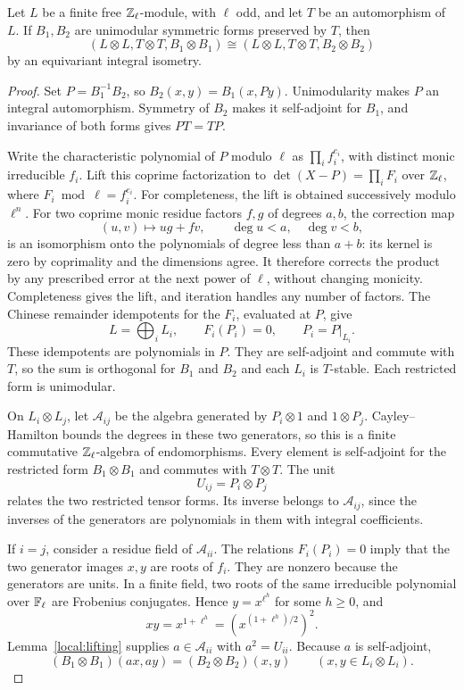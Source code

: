 \begin{proposition}\label{local:odd-primes}
Let $L$ be a finite free $\mathbb Z_\ell$-module, with $\ell$ odd, and let
$T$ be an automorphism of $L$.  If $B_1,B_2$ are unimodular symmetric
forms preserved by $T$, then
\[
 (L\otimes L,T\otimes T,B_1\otimes B_1)
 \cong
 (L\otimes L,T\otimes T,B_2\otimes B_2)
\]
by an equivariant integral isometry.
\end{proposition}

\begin{proof}
Set $P=B_1^{-1}B_2$, so
$B_2(x,y)=B_1(x,Py)$.  Unimodularity makes $P$ an integral
automorphism.  Symmetry of $B_2$ makes it self-adjoint for $B_1$, and
invariance of both forms gives $PT=TP$.

Write the characteristic polynomial of $P$ modulo $\ell$ as
$\prod_i f_i^{e_i}$, with distinct monic irreducible $f_i$.
Lift this coprime factorization to
$\det(X-P)=\prod_i F_i$ over $\mathbb Z_\ell$, where
$F_i\bmod\ell=f_i^{e_i}$.  For completeness, the lift is obtained
successively modulo $\ell^n$.  For two coprime monic residue factors
$f,g$ of degrees $a,b$, the correction map
\[
 (u,v)\longmapsto ug+fv,\qquad \deg u<a,\quad\deg v<b,
\]
is an isomorphism onto the polynomials of degree less than $a+b$:
its kernel is zero by coprimality and the dimensions agree.  It
therefore corrects the product by any prescribed error at the next
power of $\ell$, without changing monicity.  Completeness gives the
lift, and iteration handles any number of factors.  The Chinese remainder
idempotents for the $F_i$, evaluated at $P$, give
\[
 L=\bigoplus_i L_i,\qquad F_i(P_i)=0,
 \qquad P_i=P|_{L_i}.
\]
These idempotents are polynomials in $P$.  They are self-adjoint and
commute with $T$, so the sum is orthogonal for $B_1$ and $B_2$ and each
$L_i$ is $T$-stable.  Each restricted form is unimodular.

On $L_i\otimes L_j$, let $\mathcal A_{ij}$ be the algebra generated
by $P_i\otimes1$ and $1\otimes P_j$.  Cayley--Hamilton bounds the
degrees in these two generators, so this is a finite commutative
$\mathbb Z_\ell$-algebra of endomorphisms.  Every element is self-adjoint
for the restricted form $B_1\otimes B_1$ and commutes with
$T\otimes T$.  The unit
\[
 U_{ij}=P_i\otimes P_j
\]
relates the two restricted tensor forms.  Its inverse belongs to
$\mathcal A_{ij}$, since the inverses of the generators are polynomials
in them with integral coefficients.

If $i=j$, consider a residue field of $\mathcal A_{ii}$.
The relations $F_i(P_i)=0$ imply that the two generator images
$x,y$ are roots of $f_i$.  They are nonzero because the generators
are units.  In a finite field, two roots of the same irreducible
polynomial over $\mathbb F_\ell$ are Frobenius conjugates.  Hence
$y=x^{\ell^h}$ for some $h\geq0$, and
\[
 xy=x^{1+\ell^h}
    =\left(x^{(1+\ell^h)/2}\right)^2.
\]
Lemma~\ref{local:lifting} supplies $a\in\mathcal A_{ii}$ with
$a^2=U_{ii}$.  Because $a$ is self-adjoint,
\[
 (B_1\otimes B_1)(ax,ay)=(B_2\otimes B_2)(x,y)
 \qquad(x,y\in L_i\otimes L_i).
\]


\end{proof}
